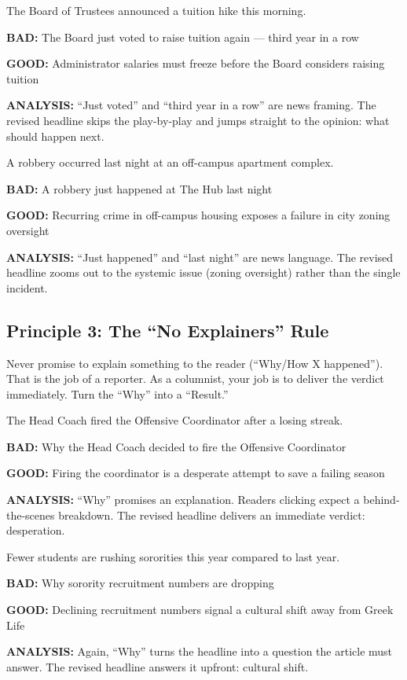 \documentclass[12pt]{article}
\newcommand{\bad}[1]{\textbf{\textcolor{rose}{BAD:}} #1}
\newcommand{\good}[1]{\textbf{\textcolor{congaree}{GOOD:}} #1}
\newcommand{\context}[1]{#1}
\begin{document}
\begin{exampleblock}
\context{The Board of Trustees announced a tuition hike this morning.}

\bad{The Board just voted to raise tuition again --- third year in a row}

\good{Administrator salaries must freeze before the Board considers raising tuition}

\textbf{ANALYSIS:} ``Just voted'' and ``third year in a row'' are news framing. The revised headline skips the play-by-play and jumps straight to the opinion: what should happen next.
\end{exampleblock}

\begin{exampleblock}
\context{A robbery occurred last night at an off-campus apartment complex.}

\bad{A robbery just happened at The Hub last night}

\good{Recurring crime in off-campus housing exposes a failure in city zoning oversight}

\textbf{ANALYSIS:} ``Just happened'' and ``last night'' are news language. The revised headline zooms out to the systemic issue (zoning oversight) rather than the single incident.
\end{exampleblock}

\newpage
\subsection{Principle 3: The ``No Explainers'' Rule}
Never promise to explain something to the reader (``Why/How X happened''). That is the job of a reporter. As a columnist, your job is to deliver the verdict immediately. Turn the ``Why'' into a ``Result.''

\begin{exampleblock}
\context{The Head Coach fired the Offensive Coordinator after a losing streak.}

\bad{Why the Head Coach decided to fire the Offensive Coordinator}

\good{Firing the coordinator is a desperate attempt to save a failing season}

\textbf{ANALYSIS:} ``Why'' promises an explanation. Readers clicking expect a behind-the-scenes breakdown. The revised headline delivers an immediate verdict: desperation.
\end{exampleblock}

\begin{exampleblock}
\context{Fewer students are rushing sororities this year compared to last year.}

\bad{Why sorority recruitment numbers are dropping}

\good{Declining recruitment numbers signal a cultural shift away from Greek Life}

\textbf{ANALYSIS:} Again, ``Why'' turns the headline into a question the article must answer. The revised headline answers it upfront: cultural shift.
\end{exampleblock}
\end{document}
